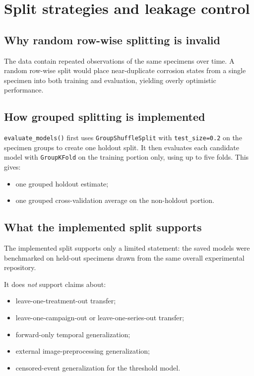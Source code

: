 \documentclass[11pt]{article}
\begin{document}
\section{Split strategies and leakage control}

\subsection{Why random row-wise splitting is invalid}
The data contain repeated observations of the same specimens over time. A random row-wise split would place near-duplicate corrosion states from a single specimen into both training and evaluation, yielding overly optimistic performance.

\subsection{How grouped splitting is implemented}
\texttt{evaluate\_models()} first uses \texttt{GroupShuffleSplit} with \texttt{test\_size=0.2} on the specimen groups to create one holdout split. It then evaluates each candidate model with \texttt{GroupKFold} on the training portion only, using up to five folds. This gives:
\begin{itemize}
  \item one grouped holdout estimate;
  \item one grouped cross-validation average on the non-holdout portion.
\end{itemize}

\subsection{What the implemented split supports}
The implemented split supports only a limited statement: the saved models were benchmarked on held-out specimens drawn from the same overall experimental repository.

It does \emph{not} support claims about:
\begin{itemize}
  \item leave-one-treatment-out transfer;
  \item leave-one-campaign-out or leave-one-series-out transfer;
  \item forward-only temporal generalization;
  \item external image-preprocessing generalization;
  \item censored-event generalization for the threshold model.
\end{itemize}
\end{document}
